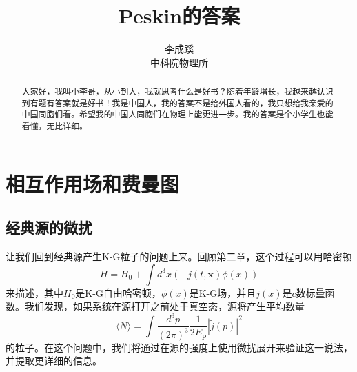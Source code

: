 \documentclass[a4paper]{article}
\begin{document}
\title{Peskin的答案}
\author{李成蹊\\中科院物理所}
\date{}
\maketitle
\begin{abstract}
    大家好，我叫小李哥，从小到大，我就思考什么是好书？随着年龄增长，我越来越认识到有题有答案就是好书！我是中国人，我的答案不是给外国人看的，我只想给我亲爱的中国同胞们看。希望我的中国人同胞们在物理上能更进一步。我的答案是个小学生也能看懂，无比详细。
\end{abstract}
\section{相互作用场和费曼图}
\subsection{经典源的微扰}
让我们回到经典源产生K-G粒子的问题上来。回顾第二章，这个过程可以用哈密顿
\begin{equation}
    H=H_0+\int d^3x(-j(t,\mathbf{x})\phi(x))
\end{equation}
来描述，其中$H_0$是K-G自由哈密顿，$\phi(x)$是K-G场，并且$j(x)$是$c$数标量函数。我们发现，如果系统在源打开之前处于真空态，源将产生平均数量
\begin{equation}
    \langle N\rangle=\int \frac{d^3p}{(2\pi)^3}\frac{1}{2E_{\mathbf{p}}}|\tilde{j}(p)|^2
\end{equation}
的粒子。在这个问题中，我们将通过在源的强度上使用微扰展开来验证这一说法，并提取更详细的信息。
\end{document}
